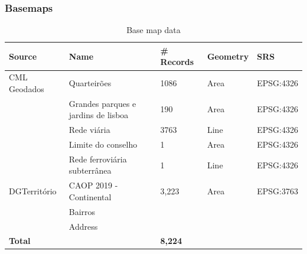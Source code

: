 \subsubsection{Basemaps}
\begin{table} [H]
		\centering
		\begin{tabular}{| l l l l l |}
			\hline
			Source & Name & \# Records & Geometry & SRS \\ 
			\hline
			\hline
			CML Geodados & Quarteirões & 1086 & Area & EPSG:4326 \\
			& Grandes parques e jardins de lisboa & 190 & Area & EPSG:4326 \\
			& Rede viária & 3763 & Line &  EPSG:4326 \\
			& Limite do conselho & 1 & Area & EPSG:4326 \\
			& Rede ferroviária subterrânea & 1 & Line & EPSG:4326 \\
			\hline
			DGTerritório & CAOP 2019 - Continental & 3,223 & Area & EPSG:3763 \\
			\hline
			& {\color{red}Bairros} &  &  &  \\
			\hline
			& {\color{red}Address} &  &  &  \\
			\hline
			\hline
			\textbf{Total} & & \textbf{ \textbf{\color{red}8,224}} & & \\
			\hline
		\end{tabular}
		\caption{Base map data}
		\label{table:data_basemaps}
\end{table}

